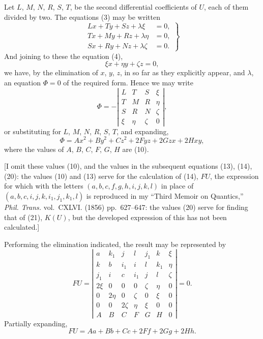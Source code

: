 \documentclass[11pt]{article}
\begin{document}
Let $L$, $M$, $N$, $R$, $S$, $T$, be the second differential coefficients of $U$, each of
them divided by two. The equations (3) may be written
\[
\left.
\begin{aligned}
Lx+Ty+Sz+\lambda\xi&=0,\\
Tx+My+Rz+\lambda\eta&=0,\\
Sx+Ry+Nz+\lambda\zeta&=0.
\end{aligned}
\right\}\tag{7}
\]
And joining to these the equation (4),
\[
\xi x+\eta y+\zeta z=0,
\]
we have, by the elimination of $x$, $y$, $z$, in so far as they explicitly appear, and
$\lambda$, an equation $\Phi=0$ of the required form. Hence we may write
\[
\Phi=-\left|
\begin{array}{cccc}
L&T&S&\xi\\
T&M&R&\eta\\
S&R&N&\zeta\\
\xi&\eta&\zeta&0
\end{array}
\right|,\tag{8}
\]
or substituting for $L$, $M$, $N$, $R$, $S$, $T$, and expanding,
\[
\Phi=Ax^2+By^2+Cz^2+2Fyz+2Gzx+2Hxy,\tag{9}
\]
where the values of $A$, $B$, $C$, $F$, $G$, $H$ are \dotfill (10).

[I omit these values (10), and the values in the subsequent equations (13), (14),
(20): the values (10) and (13) serve for the calculation of (14), $FU$, the expression
for which with the letters $(a,b,c,f,g,h,i,j,k,l)$ in place of
$(a,b,c,i,j,k,i_1,j_1,k_1,l)$ is reproduced in my ``Third Memoir on Quantics,''
\textit{Phil. Trans.} vol.~CXLVI. (1856) pp.~627--647: the values (20) serve for finding
that of (21), $K(U)$, but the developed expression of this has not been calculated.]

Performing the elimination indicated, the result may be represented by
\[
FU=\left|
\begin{array}{ccccccc}
a&k_1&j&l&j_1&k&\xi\\
k&b&i_1&i&l&k_1&\eta\\
j_1&i&c&i_1&j&l&\zeta\\
2\xi&0&0&0&\zeta&\eta&0\\
0&2\eta&0&\zeta&0&\xi&0\\
0&0&2\zeta&\eta&\xi&0&0\\
A&B&C&F&G&H&0
\end{array}
\right|=0.\tag{11}
\]
Partially expanding,
\[
FU=Aa+Bb+Cc+2Ff+2Gg+2Hh.\tag{12}
\]

\newpage
\setcounter{page}{232}
\end{document}
